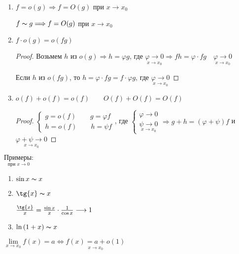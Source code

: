 \begin{enumerate}
\begin{proof}
        $g \thicksim f \Longleftrightarrow g = f + o(f) \Longleftrightarrow f = g + o(f)$
    \end{proof}

    \item $f = o(g) \Longrightarrow f = O(g)$ при $x \longrightarrow x_0$
    
    $f \thicksim g \Longrightarrow f = O(g)$ при $x \longrightarrow x_0$

    \item $f \cdot o(g) = o(fg)$
    
    \begin{proof}
        Возьмем $h$ из $o(g) \Longrightarrow h = \varphi g$, где $\underset{x \longrightarrow x_0}{\varphi \longrightarrow 0}
        \Longrightarrow fh = \varphi \cdot fg \quad \underset{x \longrightarrow x_0}{\varphi \longrightarrow 0}$

        Если $h$ из $o(fg)$, то $h = \varphi \cdot fg = f \cdot \varphi g$, где 
        $\underset{x \longrightarrow x_0}{\varphi \longrightarrow 0}$
    \end{proof}

    \item $o(f) + o(f) = o(f) \qquad O(f) + O(f) = O(f)$
    
    \begin{proof} \quad

        $\begin{cases}
            g = o(f) \qquad g = \varphi f \\
            h = o(f) \qquad h = \psi f
        \end{cases}$, где $\begin{cases}
            \varphi \longrightarrow 0 \\
            \underset{x \longrightarrow x_0}{\psi \longrightarrow 0}
        \end{cases} \Longrightarrow g + h = (\varphi + \psi)f$ и $\underset{x \longrightarrow x_0}{\varphi + \psi \longrightarrow 0}$
    \end{proof}
\end{enumerate}

$\underset{\text{при } x \longrightarrow 0}{\textbf{Примеры:}}$
\begin{enumerate}
    \item $\sin{x} \thicksim x$
    \item $\tg{x} \thicksim x$
    
    $\frac{\tg{x}}{x} = \frac{\sin{x}}{x} \cdot \frac{1}{\cos{x}} \longrightarrow 1$
    \item$\ln{(1+x)} \thicksim x$
\end{enumerate}
\notice $\lim\limits_{x \rightarrow x_0}{f(x) = a} \Longleftrightarrow \underset{x \longrightarrow x_0}{f(x) = a + o(1)}$

